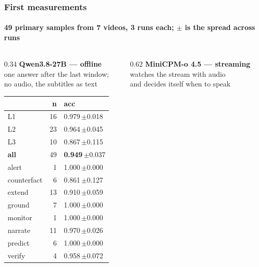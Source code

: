 \documentclass[aspectratio=169,10pt]{beamer}
\newcommand{\sd}[1]{{\color{muted}\,$\pm$#1}}  %
\begin{document}
\begin{frame}
  \frametitle{First measurements}
  \framesubtitle{49 primary samples from 7 videos, 3 runs each; $\pm$ is the spread across runs}

  \renewcommand{\arraystretch}{0.92}
  \begin{columns}[T]
    \begin{column}{0.34\textwidth}
      {\color{accent}\bfseries Qwen3.8-27B — offline}\\[0.1em]
      {\scriptsize\color{muted} one answer after the last window;\\ no audio, the subtitles as text}\\[0.4em]
      \scriptsize
      \begin{tabular}{@{}lrl@{}}
        \toprule
        & \textbf{n} & \textbf{acc} \\
        \midrule
        L1 & 16 & 0.979\sd{0.018} \\
        L2 & 23 & 0.964\sd{0.045} \\
        L3 & 10 & 0.867\sd{0.115} \\
        \textbf{all} & 49 & \textbf{0.949}\sd{0.037} \\
        \midrule
        alert       &  1 & 1.000\sd{0.000} \\
        counterfact &  6 & 0.861\sd{0.127} \\
        extend      & 13 & 0.910\sd{0.059} \\
        ground      &  7 & 1.000\sd{0.000} \\
        monitor     &  1 & 1.000\sd{0.000} \\
        narrate     & 11 & 0.970\sd{0.026} \\
        predict     &  6 & 1.000\sd{0.000} \\
        verify      &  4 & 0.958\sd{0.072} \\
        \bottomrule
      \end{tabular}
    \end{column}
    \begin{column}{0.62\textwidth}
      {\color{warm}\bfseries MiniCPM-o 4.5 — streaming}\\[0.1em]
      {\scriptsize\color{muted} watches the stream with audio\\ and decides itself when to speak}\\[0.4em]
      \scriptsize
      \begin{tabular}{@{}lrlll@{}}

\end{tabular}
\end{column}
\end{columns}
\end{frame}
\end{document}
